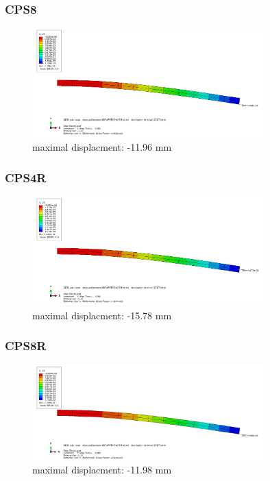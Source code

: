 \documentclass[12pt]{article}
\begin{document}
\subsubsection{CPS8}
\begin{figure}[!htb]
  \centering
  \includegraphics[width=0.8\textwidth]{pics/2_12_CPS8}
  \caption{maximal displacment: -11.96 mm}
\end{figure}
\FloatBarrier
\pagebreak
\subsubsection{CPS4R}
\begin{figure}[!htb]
  \centering
  \includegraphics[width=0.8\textwidth]{pics/2_12_CPS4R}
  \caption{maximal displacment: -15.78 mm}
\end{figure}
\FloatBarrier
\subsubsection{CPS8R}
\begin{figure}[!htb]
  \centering
  \includegraphics[width=0.8\textwidth]{pics/2_12_CPS8R}
  \caption{maximal displacment: -11.98 mm}
\end{figure}
\FloatBarrier
\pagebreak
\end{document}
